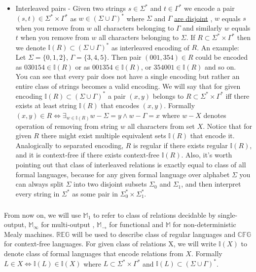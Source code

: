 \documentclass[12pt]{article}
\begin{document}
\begin{itemize}
	\item Interleaved pairs - Given two strings $s \in \Sigma^*$ and $t \in \Gamma^*$ we encode a pair $(s,t) \in \Sigma^* \times \Gamma^*$ as $w \in (\Sigma \cup \Gamma)^* $ where $\Sigma$ and $\Gamma$ \underline{are disjoint} , $w$ equals $s$ when you remove from $w$ all characters belonging to $\Gamma$ and similarly $w$ equals $t$ when you remove from $w$ all characters belonging to $\Sigma$. If $R \subset  \Sigma^* \times \Gamma^*$ then we denote $\mathbb{I}(R) \subset (\Sigma \cup \Gamma)^*$ as interleaved encoding of $R$. An example:\\
	Let $\Sigma = \{0,1,2\}$, $\Gamma = \{3,4,5\}$. Then pair $(001,354) \in R$ could be encoded as $030154 \in \mathbb{I}(R)$ or as $001354 \in \mathbb{I}(R)$, or $354001 \in \mathbb{I}(R)$ and so on. \\
	You can see that every pair does not have a single encoding but rather an entire class of strings becomes a valid encoding. We will say that for given encoding $\mathbb{I}(R) \subset (\Sigma \cup \Gamma)^*$ a pair $(x,y)$ belongs to $R \subset \Sigma^* \times \Gamma^*$ iff there exists at least string $\mathbb{I}(R)$ that encodes $(x,y)$. Formally $(x,y) \in R \iff \exists_{w\in\mathbb{I}(R)} w - \Sigma = y \wedge w - \Gamma = x$ where $w-X$ denotes operation of removing from string $w$ all characters from set $X$. Notice that for given $R$ there might exist multiple equivalent sets $\mathbb{I}(R)$ that encode it. Analogically to separated encoding, $R$ is regular if there exists regular $\mathbb{I}(R)$, and it is context-free if there exists context-free $\mathbb{I}(R)$. Also, it's worth pointing out that class of interleaved relations is exactly equal to class of all formal languages, because for any given formal language over alphabet $\Sigma$ you can always split $\Sigma$ into two disjoint subsets $\Sigma_0$ and $\Sigma_1$, and then interpret every string in $\Sigma^*$ as some pair in $\Sigma_0^* \times \Sigma_1^*$.
\end{itemize}
 
 \subparagraph{} From now on, we will use $\mathbb{M}_1$ to refer to class of relations decidable by single-output, $\mathbb{M}_\infty$ for multi-output , $\mathbb{M}_\rightarrow$ for functional and $\mathbb{M}$ for non-deterministic Mealy machines. $\mathbb{REG}$ will be used to describe class of regular languages  and $\mathbb{CFG}$ for context-free languages. For given class of relations X, we will write $\mathbb{I}(X)$ to denote class of formal languages that encode relations from $X$. Formally $L  \in X \iff \mathbb{I}(L)  \in \mathbb{I}(X)$ where $L \subset \Sigma^* \times \Gamma^*$ and $\mathbb{I}(L) \subset (\Sigma \cup \Gamma)^*$. 
 
\end{document}
